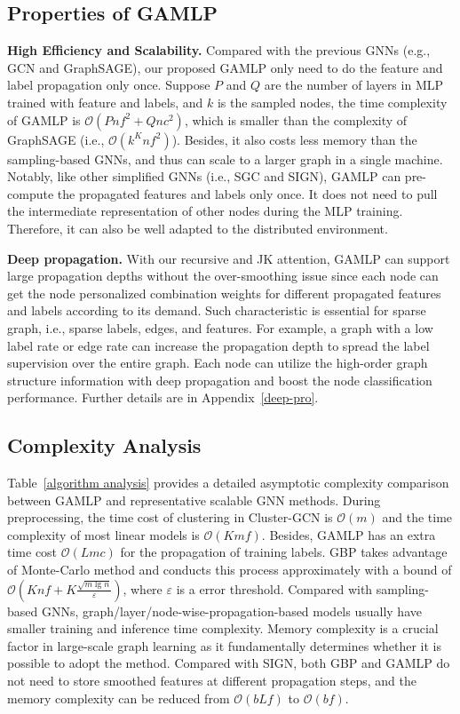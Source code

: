 \documentclass[sigconf]{acmart}
\newcommand{\sys}{\textsc{GAMLP}\xspace}
\begin{document}
\subsection{Properties of \sys}
\noindent\textbf{High Efficiency and Scalability.}
Compared with the previous GNNs (e.g., GCN and GraphSAGE), our proposed GAMLP only need to do the feature and label propagation only once. Suppose $P$ and $Q$ are the number of layers in MLP trained with feature and labels, and $k$ is the sampled nodes, the time complexity of GAMLP is $\mathcal{O}(Pnf^2+Qnc^2)$, which is smaller than the complexity of GraphSAGE (i.e., $\mathcal{O}(k^Knf^2)$). Besides, it also costs less memory than the sampling-based GNNs, and thus can scale to a larger graph in a single machine. 
Notably, like other simplified GNNs (i.e., SGC and SIGN),  GAMLP can pre-compute the propagated features and labels only once. It does not need to pull the intermediate representation of other nodes during the MLP training. Therefore, it can also be well adapted to the distributed environment. 


\noindent\textbf{Deep propagation.}
With our recursive and JK attention, GAMLP can support large propagation depths without the over-smoothing issue since each node can get the node personalized combination weights for different propagated features and labels according to its demand. Such characteristic is essential for sparse graph, i.e., sparse labels, edges, and features. For example, a graph with a low label rate or edge rate can increase the propagation depth to spread the label supervision over the entire graph. Each node can utilize the high-order graph structure information with deep propagation and boost the node classification performance. Further details are in Appendix~\ref{deep-pro}.

\subsection{Complexity Analysis}
\label{complexity}
Table~\ref{algorithm analysis} provides a detailed asymptotic complexity comparison between GAMLP and representative scalable GNN methods.
During preprocessing, the time cost of clustering in Cluster-GCN is $\mathcal{O}(m)$ and the time complexity of most linear models is $\mathcal{O}(Kmf)$. 
Besides, GAMLP has an extra time cost $\mathcal{O}(Lmc)$ for the propagation of training labels.
GBP takes advantage of Monte-Carlo method and conducts this process approximately with a bound of $\mathcal{O}(Knf + K\frac{\sqrt{m\lg{n}}}{\varepsilon})$, where $\varepsilon$ is a error threshold. 
Compared with sampling-based GNNs, graph/layer/node-wise-propagation-based models usually have smaller training and inference time complexity.
Memory complexity is a crucial factor in large-scale graph learning as it fundamentally determines whether it is possible to adopt the method.
Compared with SIGN, both GBP and GAMLP do not need to store smoothed features at different propagation steps, and the memory complexity can be reduced from $\mathcal{O}(bLf)$ to $\mathcal{O}(bf)$.
\end{document}
